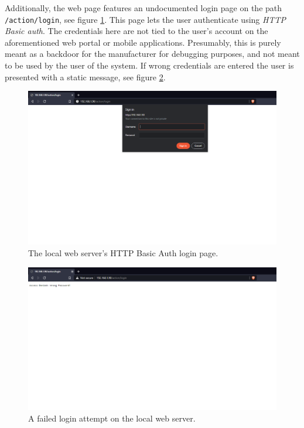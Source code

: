 Additionally, the web page features an undocumented login page on the path \texttt{/action/login}, see figure \ref{fig:local-login-page}. This page lets the user authenticate using \textit{HTTP Basic auth}. The credentials here are not tied to the user's account on the aforementioned web portal or mobile applications. Presumably, this is purely meant as a backdoor for the manufacturer for debugging purposes, and not meant to be used by the user of the system. If wrong credentials are entered the user is presented with a static message, see figure \ref{fig:local-login-denied}.
\begin{figure}[!ht]
    \centering
    \includegraphics[width=\textwidth]{images/3-system/local-login-page.png}
    \caption{The local web server's HTTP Basic Auth login page.}
    \label{fig:local-login-page}
\end{figure}
\begin{figure}[!ht]
    \centering
    \includegraphics[width=\textwidth]{images/3-system/local-login-denied.png}
    \caption{A failed login attempt on the local web server.}
    \label{fig:local-login-denied}
\end{figure}

